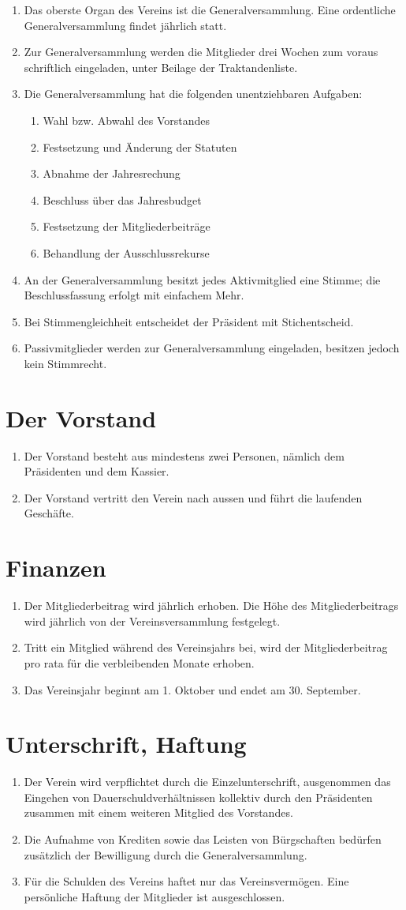 \documentclass[10pt,a4paper,parskip,fleqn]{scrartcl}
\newcommand{\ol}{\begin{enumerate}[itemsep=-0.2em,topsep=-0.2em]}
\newcommand{\lo}{\end{enumerate}}
\newcommand{\li}{\item}
\begin{document}
\ol
	\li Das oberste Organ des Vereins ist die Generalversammlung. Eine ordentliche
	Generalversammlung findet jährlich statt.
	\li Zur Generalversammlung werden die Mitglieder drei Wochen zum voraus
	schriftlich eingeladen, unter Beilage der Traktandenliste.
	\li Die Generalversammlung hat die folgenden unentziehbaren Aufgaben:
		\ol
			\li Wahl bzw. Abwahl des Vorstandes
			\li Festsetzung und Änderung der Statuten
			\li Abnahme der Jahresrechung
			\li Beschluss über das Jahresbudget
			\li Festsetzung der Mitgliederbeiträge
			\li Behandlung der Ausschlussrekurse
		\lo
	\li An der Generalversammlung besitzt jedes Aktivmitglied eine Stimme; die
	Beschlussfassung erfolgt mit einfachem Mehr.
	\li Bei Stimmengleichheit entscheidet der Präsident mit Stichentscheid.
	\li Passivmitglieder werden zur Generalversammlung eingeladen, besitzen jedoch
	kein Stimmrecht.
\lo


\section{Der Vorstand}

\ol
	\li Der Vorstand besteht aus mindestens zwei Personen, nämlich dem Präsidenten
	und dem Kassier.
	\li Der Vorstand vertritt den Verein nach aussen und führt die laufenden
	Geschäfte.
\lo


\section{Finanzen}

\ol
	\li Der Mitgliederbeitrag wird jährlich erhoben. Die Höhe des
	Mitgliederbeitrags wird jährlich von der Vereinsversammlung festgelegt.
	\li Tritt ein Mitglied während des Vereinsjahrs bei, wird der
	Mitgliederbeitrag pro rata für die verbleibenden Monate erhoben.
	\li Das Vereinsjahr beginnt am 1. Oktober und endet am 30. September.
\lo


\section{Unterschrift, Haftung}

\ol
	\li Der Verein wird verpflichtet durch die Einzelunterschrift, ausgenommen das
	Eingehen von Dauerschuldverhältnissen kollektiv durch den Präsidenten zusammen
	mit einem weiteren Mitglied des Vorstandes.
	\li Die Aufnahme von Krediten sowie das Leisten von Bürgschaften bedürfen
	zusätzlich der Bewilligung durch die Generalversammlung.
	\li Für die Schulden des Vereins haftet nur das Vereinsvermögen. Eine
	persönliche Haftung der Mitglieder ist ausgeschlossen.
\lo
\end{document}
